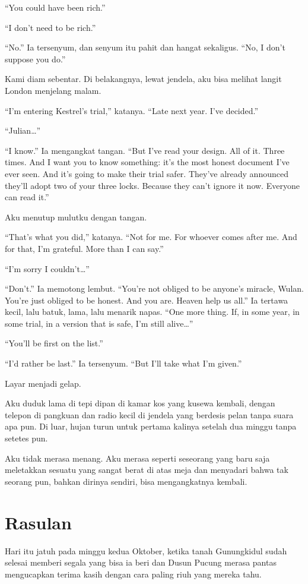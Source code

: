 \documentclass[11pt,twoside,openany]{book}
\begin{document}
``You could have been rich.''

``I don't need to be rich.''

``No.'' Ia tersenyum, dan senyum itu pahit dan hangat sekaligus. ``No, I don't suppose you do.''

Kami diam sebentar. Di belakangnya, lewat jendela, aku bisa melihat langit London menjelang malam.

``I'm entering Kestrel's trial,'' katanya. ``Late next year. I've decided.''

``Julian\ldots{}''

``I know.'' Ia mengangkat tangan. ``But I've read your design. All of it. Three times. And I want you to know something: it's the most honest document I've ever seen. And it's going to make their trial safer. They've already announced they'll adopt two of your three locks. Because they can't ignore it now. Everyone can read it.''

Aku menutup mulutku dengan tangan.

``That's what you did,'' katanya. ``Not for me. For whoever comes after me. And for that, I'm grateful. More than I can say.''

``I'm sorry I couldn't\ldots{}''

``Don't.'' Ia memotong lembut. ``You're not obliged to be anyone's miracle, Wulan. You're just obliged to be honest. And you are. Heaven help us all.'' Ia tertawa kecil, lalu batuk, lama, lalu menarik napas. ``One more thing. If, in some year, in some trial, in a version that is safe, I'm still alive\ldots{}''

``You'll be first on the list.''

``I'd rather be last.'' Ia tersenyum. ``But I'll take what I'm given.''

Layar menjadi gelap.

Aku duduk lama di tepi dipan di kamar kos yang kusewa kembali, dengan telepon di pangkuan dan radio kecil di jendela yang berdesis pelan tanpa suara apa pun. Di luar, hujan turun untuk pertama kalinya setelah dua minggu tanpa setetes pun.

Aku tidak merasa menang. Aku merasa seperti seseorang yang baru saja meletakkan sesuatu yang sangat berat di atas meja dan menyadari bahwa tak seorang pun, bahkan dirinya sendiri, bisa mengangkatnya kembali.

\chapter{Rasulan}
Hari itu jatuh pada minggu kedua Oktober, ketika tanah Gunungkidul sudah selesai memberi segala yang bisa ia beri dan Dusun Pucung merasa pantas mengucapkan terima kasih dengan cara paling riuh yang mereka tahu.
\end{document}
